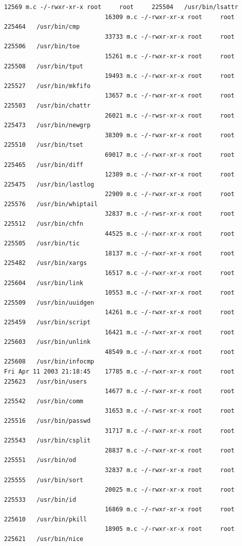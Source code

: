 {\begin{lstlisting}[style=terminal]
                            12569 m.c -/-rwxr-xr-x root     root     225504   /usr/bin/lsattr
                            16309 m.c -/-rwxr-xr-x root     root     225464   /usr/bin/cmp
                            33733 m.c -/-rwxr-xr-x root     root     225506   /usr/bin/toe
                            15261 m.c -/-rwxr-xr-x root     root     225508   /usr/bin/tput
                            19493 m.c -/-rwxr-xr-x root     root     225527   /usr/bin/mkfifo
                            13657 m.c -/-rwxr-xr-x root     root     225503   /usr/bin/chattr
                            26021 m.c -/-rwsr-xr-x root     root     225473   /usr/bin/newgrp
                            38309 m.c -/-rwxr-xr-x root     root     225510   /usr/bin/tset
                            69017 m.c -/-rwxr-xr-x root     root     225465   /usr/bin/diff
                            12389 m.c -/-rwxr-xr-x root     root     225475   /usr/bin/lastlog
                            22909 m.c -/-rwxr-xr-x root     root     225576   /usr/bin/whiptail
                            32837 m.c -/-rwsr-xr-x root     root     225512   /usr/bin/chfn
                            44525 m.c -/-rwxr-xr-x root     root     225505   /usr/bin/tic
                            18137 m.c -/-rwxr-xr-x root     root     225482   /usr/bin/xargs
                            16517 m.c -/-rwxr-xr-x root     root     225604   /usr/bin/link
                            10553 m.c -/-rwxr-xr-x root     root     225509   /usr/bin/uuidgen
                            14261 m.c -/-rwxr-xr-x root     root     225459   /usr/bin/script
                            16421 m.c -/-rwxr-xr-x root     root     225603   /usr/bin/unlink
                            48549 m.c -/-rwxr-xr-x root     root     225608   /usr/bin/infocmp
Fri Apr 11 2003 21:18:45    17785 m.c -/-rwxr-xr-x root     root     225623   /usr/bin/users
                            14677 m.c -/-rwxr-xr-x root     root     225542   /usr/bin/comm
                            31653 m.c -/-rwsr-xr-x root     root     225516   /usr/bin/passwd
                            31717 m.c -/-rwxr-xr-x root     root     225543   /usr/bin/csplit
                            28837 m.c -/-rwxr-xr-x root     root     225551   /usr/bin/od
                            32837 m.c -/-rwxr-xr-x root     root     225555   /usr/bin/sort
                            20025 m.c -/-rwxr-xr-x root     root     225533   /usr/bin/id
                            16869 m.c -/-rwxr-xr-x root     root     225610   /usr/bin/pkill
                            18905 m.c -/-rwxr-xr-x root     root     225621   /usr/bin/nice

\end{lstlisting}}
